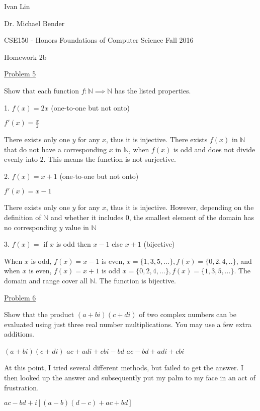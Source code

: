 \documentclass{article}
\begin{document}
Ivan Lin

Dr. Michael Bender

CSE150 - Honors Foundations of Computer Science Fall 2016

\begin{center}
Homework 2b
\end{center}

\underline{Problem 5}

Show that each function $f: \mathbb{N} \implies \mathbb{N}$ has the listed properties.

1. $f(x)=2x$ (one-to-one but not onto)

$f'(x)=\frac{x}{2}$

There exists only one $y$ for any $x$, thus it is injective. There exists $f(x)$ in $\mathbb{N}$ that do not have a corresponding $x$ in $\mathbb{N}$, when $f(x)$ is odd and does not divide evenly into $2$. This means the function is not surjective.\newline


2. $f(x)=x+1$ (one-to-one but not onto)

$f'(x)=x-1$

There exists only one $y$ for any $x$, thus it is injective. However, depending on the definition of $\mathbb{N}$ and whether it includes $0$, the smallest element of the domain has no corresponding $y$ value in $\mathbb{N}$\newline


3. $f(x)=$ if $x$ is odd then $x-1$ else $x+1$ (bijective)

When $x$ is odd, $f(x)=x-1$ is even, $x=\{1,3,5,...\},f(x)=\{0,2,4,..\}$, and when $x$ is even, $f(x)=x+1$ is odd $x=\{0,2,4,...\},f(x)=\{1,3,5,...\}$. The domain and range cover all $\mathbb{N}$. The function is bijective.\newline


\underline{Problem 6}

Show that the product $(a+bi)(c+di)$ of two complex numbers can be evaluated using just three real number multiplications. You may use a few extra additions.

$(a+bi)(c+di)$\newline
$ac+adi+cbi-bd$\newline
$ac-bd+adi+cbi$

At this point, I tried several different methods, but failed to get the answer. I then looked up the answer and subsequently put my palm to my face in an act of frustration.

$ac-bd+i[(a-b)(d-c)+ac+bd]$\newline
\end{document}

